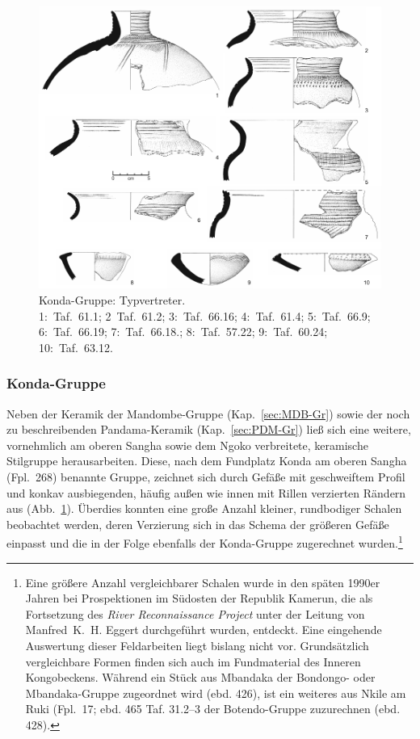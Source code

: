 \begin{figure}[tb]
	\centering
	\includegraphics[width=.95\textwidth]{fig/KON-Typen.pdf}
	\caption{Konda-Gruppe: Typvertreter.\\1:~Taf.~61.1; 2~Taf.~61.2; 3:~Taf.~66.16; 4:~Taf.~61.4; 5:~Taf.~66.9; 6:~Taf.~66.19; 7:~Taf.~66.18.; 8:~Taf.~57.22; 9:~Taf.~60.24; 10:~Taf.~63.12.}
	\label{fig:KON_Typvertreter}
\end{figure}

\subsubsection{Konda-Gruppe}\label{sec:KON-Gr}

Neben der Keramik der Mandombe-Gruppe (Kap.~\ref{sec:MDB-Gr}) sowie der noch zu beschreibenden Pandama-Keramik (Kap.~\ref{sec:PDM-Gr}) ließ sich eine weitere, vornehmlich am oberen \mbox{Sangha} sowie dem \mbox{Ngoko} verbreitete, keramische Stilgruppe herausarbeiten. Diese, nach dem Fundplatz Konda am oberen \mbox{Sangha} (Fpl.~268) benannte Gruppe, zeichnet sich durch Gefäße mit geschweiftem Profil und konkav ausbiegenden, häufig außen wie innen mit Rillen verzierten Rändern aus (Abb.~\ref{fig:KON_Typvertreter}). Überdies konnten eine große Anzahl kleiner, rundbodiger Schalen beobachtet werden, deren Verzierung sich in das Schema der größeren Gefäße einpasst und die in der Folge ebenfalls der Konda-Gruppe zugerechnet wurden.\footnote{Eine größere Anzahl vergleichbarer Schalen wurde in den späten 1990er Jahren bei Prospektionen im Südosten der Republik Kamerun, die als Fortsetzung des \textit{River Reconnaissance Project} unter der Leitung von Manfred~K.~H. Eggert durchgeführt wurden, entdeckt. Eine eingehende Auswertung dieser Feldarbeiten liegt bislang nicht vor. Grundsätzlich vergleichbare Formen finden sich auch im Fundmaterial des Inneren Kongobeckens. Während ein Stück aus Mbandaka \parencite[Fpl.~10, ][445 Taf. 11.3]{Wotzka.1995} der Bondongo- oder Mbandaka-Gruppe zugeordnet wird (ebd. 426), ist ein weiteres aus Nkile am Ruki (Fpl.~17; ebd. 465 Taf. 31.2--3 der Botendo-Gruppe zuzurechnen (ebd. 428).\label{ftn:KON-PDM_klSchalen}} 

